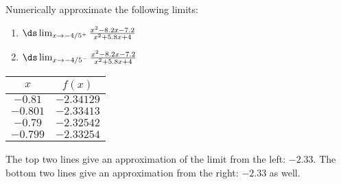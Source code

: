 {Numerically approximate the following limits:
\begin{enumerate}
\item	$\ds \lim_{x\to -4/5^+} \frac{x^2-8.2 x-7.2}{x^2+5.8 x+4}$
\item	$\ds \lim_{x\to -4/5^-} \frac{x^2-8.2 x-7.2}{x^2+5.8 x+4}$
\end{enumerate}
}
{\begin{tabular}{cc}
$x$ & $f(x)$ \\ \hline 
$-0.81 $& $-2.34129$ \\
$ -0.801$ & $-2.33413$ \\
$ -0.79 $& $-2.32542 $\\
$ -0.799$ & $-2.33254$
\end{tabular}

The top two lines give an approximation of the limit from the left: $-2.33$. The bottom two lines give an approximation from the right: $-2.33$ as well.
}
